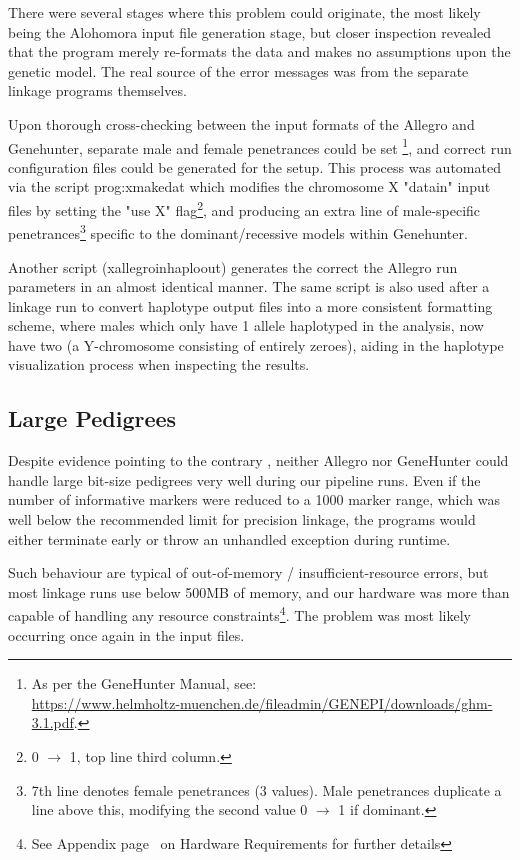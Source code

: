There were several stages where this problem could originate, the most likely being the Alohomora input file generation stage, but closer inspection revealed that the program merely re-formats the data and makes no assumptions upon the genetic model. The real source of the error messages was from the separate linkage programs themselves.

Upon thorough cross-checking between the input formats of the Allegro and Genehunter, separate male and female penetrances could be set \footnote{As per the GeneHunter Manual, see:\\\url{https://www.helmholtz-muenchen.de/fileadmin/GENEPI/downloads/ghm-3.1.pdf}.}, and correct run configuration files could be generated for the setup. This process was automated via the script \gls{prog:xmakedat} which modifies the chromosome X "datain" input files by setting the "use X" flag\footnote{0 $\rightarrow$ 1, top line third column.}, and producing an extra line of male-specific penetrances\footnote{7th line denotes female penetrances (3 values). Male penetrances duplicate a line above this, modifying the second value 0 $\rightarrow$ 1 if dominant.} specific to the dominant/recessive models within Genehunter.

Another script (xallegroinhaploout) generates the correct the Allegro run parameters in an almost identical manner. The same script is also used after a linkage run to convert haplotype output files into a more consistent formatting scheme, where males which only have 1 allele haplotyped in the analysis, now have two (a Y-chromosome consisting of entirely zeroes), aiding in the haplotype visualization process when inspecting the results.


\subsection{Large Pedigrees}\label{ref:meth:largepeds}

Despite evidence pointing to the contrary \citep{allegro_2005,ghm_2014}, neither Allegro nor GeneHunter could handle large bit-size pedigrees very well during our pipeline runs. Even if the number of informative markers were reduced to a 1000 marker range, which was well below the recommended limit for precision linkage, the programs would either terminate early or throw an unhandled exception during runtime.

Such behaviour are typical of out-of-memory / insufficient-resource errors, but most linkage runs use below 500MB of memory, and our hardware was more than capable of handling any resource constraints\footnote{See Appendix page~\pageref{ref:app:hwspec} on Hardware Requirements for further details}. The problem was most likely occurring once again in the input files.

